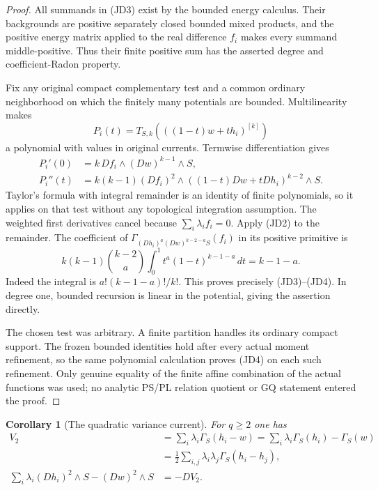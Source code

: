 \documentclass[11pt,a4paper]{article}
\numberwithin{equation}{section}
\newtheorem{corollary}[theorem]{Corollary}
\theoremstyle{definition}
\theoremstyle{remark}
\begin{document}
\begin{proof}
All summands in (JD3) exist by the bounded energy calculus.  Their
backgrounds are positive separately closed bounded mixed products,
and the positive energy matrix applied to the real difference $f_i$
makes every summand middle-positive.  Thus their finite positive
sum has the asserted degree and coefficient-Radon property.

Fix any original compact complementary test and a common ordinary
neighborhood on which the finitely many potentials are bounded.
Multilinearity makes
\[
 P_i(t)=T_{S,k}(((1-t)w+th_i)^{[k]})
\]
a polynomial with values in original currents.  Termwise
differentiation gives
\[
 \begin{split}
 P_i'(0)&=k\,Df_i\wedge(Dw)^{k-1}\wedge S,\\
 P_i''(t)&=k(k-1)(Df_i)^2\wedge
                         ((1-t)Dw+tDh_i)^{k-2}\wedge S.
 \end{split}
 \tag{JD5}
\]
Taylor's formula with integral remainder is an identity of finite
polynomials, so it applies on that test without any topological
integration assumption.  The weighted first derivatives cancel
because $\sum_i\lambda_i f_i=0$.  Apply (JD2) to the remainder.
The coefficient of
$\Gamma_{(Dh_i)^a(Dw)^{k-2-a}S}(f_i)$ in its positive primitive is
\[
 k(k-1)\binom{k-2}{a}
       \int_0^1t^a(1-t)^{k-1-a}\,dt=k-1-a.
 \tag{JD6}
\]
Indeed the integral is $a!(k-1-a)!/k!$.  This proves precisely
(JD3)--(JD4).  In degree one, bounded recursion is linear in the
potential, giving the assertion directly.

The chosen test was arbitrary.  A finite partition handles its
ordinary compact support.  The frozen bounded identities hold after
every actual moment refinement, so the same polynomial calculation
proves (JD4) on each such refinement.  Only genuine equality of the
finite affine combination of the actual functions was used; no
analytic PS/PL relation quotient or GQ statement entered the proof.
\end{proof}

\begin{corollary}[The quadratic variance current]
\label{cor:r12-quadratic-variance-current}
For $q\geq2$ one has
\[
 \begin{split}
 V_2&=\sum_i\lambda_i\Gamma_S(h_i-w)
       =\sum_i\lambda_i\Gamma_S(h_i)-\Gamma_S(w)\\
    &=\tfrac12\sum_{i,j}\lambda_i\lambda_j
                              \Gamma_S(h_i-h_j),\\
 \sum_i\lambda_i(Dh_i)^2\wedge S-(Dw)^2\wedge S&=-D V_2.
 \end{split}
 \tag{JD7}
\]
\end{corollary}
\end{document}
